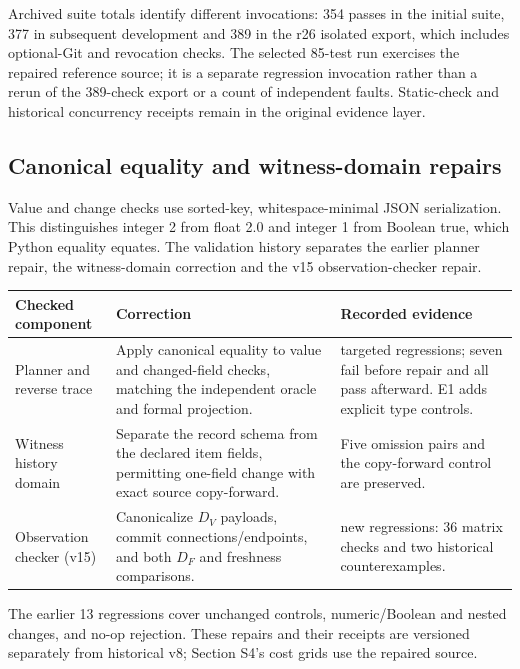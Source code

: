 \documentclass[11pt,a4paper]{article}
\begin{document}
Archived suite totals identify different invocations: 354 passes in the initial suite, 377 in subsequent development and 389 in the r26 isolated export, which includes optional-Git and revocation checks. The selected 85-test run exercises the repaired reference source; it is a separate regression invocation rather than a rerun of the 389-check export or a count of independent faults. Static-check and historical concurrency receipts remain in the original evidence layer.

\subsection{Canonical equality and witness-domain repairs}

Value and change checks use sorted-key, whitespace-minimal JSON serialization. This distinguishes integer 2 from float 2.0 and integer 1 from Boolean true, which Python equality equates. The validation history separates the earlier planner repair, the witness-domain correction and the v15 observation-checker repair.

\begin{center}\small
\begin{tabularx}{\textwidth}{@{}>{\raggedright\arraybackslash}p{}>{\raggedright\arraybackslash}X>{\raggedright\arraybackslash}p{}@{}}
\toprule
Checked component & Correction & Recorded evidence \\
\midrule
Planner and reverse trace & Apply canonical equality to value and changed-field checks, matching the independent oracle and formal projection. & 13 targeted regressions; seven fail before repair and all pass afterward. E1 adds explicit type controls. \\
Witness history domain & Separate the record schema from the declared item fields, permitting one-field change with exact source copy-forward. & Five omission pairs and the copy-forward control are preserved. \\
Observation checker (v15) & Canonicalize $D_V$ payloads, commit connections/endpoints, and both $D_F$ and freshness comparisons. & 38 new regressions: 36 matrix checks and two historical counterexamples. \\
\bottomrule
\end{tabularx}
\end{center}

The earlier 13 regressions cover unchanged controls, numeric/Boolean and nested changes, and no-op rejection. These repairs and their receipts are versioned separately from historical v8; Section S4's cost grids use the repaired source.
\end{document}
